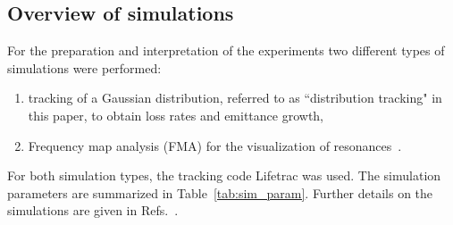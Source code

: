 \documentclass[%
 reprint,
 amsmath,amssymb,
 aps,
prstab,
longbibliography,
]{revtex4-1}
\begin{document}
\subsection{Overview of simulations\label{sec:sim}}
For the preparation and interpretation of the experiments two different types of simulations were performed:
\begin{enumerate}
	\item tracking of a Gaussian distribution, referred to as ``distribution tracking" in this paper, to obtain loss rates and emittance growth,
	\item Frequency map analysis (FMA) for the visualization of resonances~\cite{fmalaskar}.
\end{enumerate}
For both simulation types, the tracking code Lifetrac \cite{lifetrac} was used. The simulation parameters are summarized in Table~\ref{tab:sim_param}. Further details on the simulations are given in Refs.~\cite{md_sim_hel_res_ex_fitterer,resexmd2017}.
\end{document}
